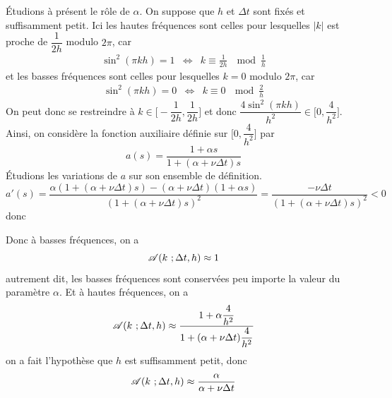 \'Etudions à présent le rôle de $\alpha$. On suppose que $h$ et $\Delta t$ sont fixés et suffisamment petit. Ici les hautes fréquences sont celles pour lesquelles $|k|$ est proche de $\dfrac{1}{2h}$ modulo $2\pi$, car 
\begin{eqnarray*}
    \sin^2(\pi k h) = 1 &\iff& k \equiv \frac{1}{2h} \ \mod{\frac{1}{h}}
\end{eqnarray*}
et les basses fréquences sont celles pour lesquelles $k=0$ modulo $2\pi$,
car 
\begin{eqnarray*}
    \sin^2(\pi k h) = 0 &\iff& k \equiv 0 \ \mod{\frac{2}{h}}
\end{eqnarray*}
On peut donc se restreindre à $k \in \Big[-\dfrac{1}{2h}, \dfrac{1}{2h}\Big]$ et donc $\dfrac{4\sin^2(\pi k h)}{h^2} \in \Big[0,\dfrac{4}{h^2}\Big]$. Ainsi, on considère la fonction auxiliaire définie sur $\Big[0,\dfrac{4}{h^2}\Big]$ par
\begin{equation*}
    a(s) = \frac{1+\alpha s}{1+(\alpha +\nu \Delta t)s}
\end{equation*}
\'Etudions les variations de $a$ sur son ensemble de définition. 
\begin{equation*}
    a'(s) = \frac{\alpha(1+(\alpha + \nu \Delta t)s)-(\alpha+\nu\Delta t)(1+\alpha s)}{(1+(\alpha +\nu \Delta t)s)^2} = \frac{-\nu \Delta t}{(1+(\alpha +\nu \Delta t)s)^2} <0
\end{equation*}
donc 
\begin{center}
\end{center}
Donc à basses fréquences, on a 
\begin{equation*}
    \mathscr{A} (k \ ; \Delta t ,h) \approx 1
\end{equation*}
autrement dit, les basses fréquences sont conservées peu importe la valeur du paramètre $\alpha$. Et à hautes fréquences, on a 
\begin{equation*}
    \mathscr{A}(k \ ; \Delta t ,h) \approx \dfrac{1+\alpha\dfrac{4}{h^2}}{1+(\alpha+\nu\Delta t)\dfrac{4}{h^2}}
\end{equation*}
on a fait l'hypothèse que $h$ est suffisamment petit, donc 
\begin{equation*}
    \mathscr{A}(k \ ; \Delta t ,h) \approx \dfrac{\alpha}{\alpha+\nu\Delta t}
\end{equation*}
